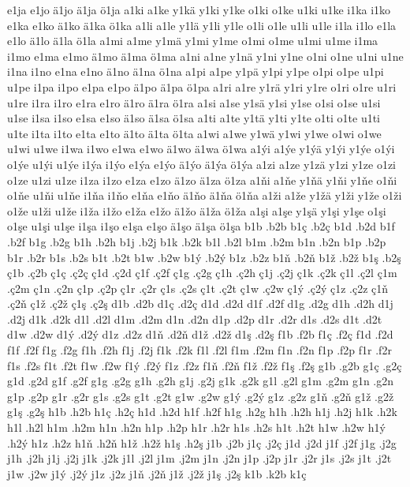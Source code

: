 {e1ja
e1jo
ä1jo
ä1ja
ö1ja
a1ki
a1ke
y1kä
y1ki
y1ke
o1ki
o1ke
u1ki
u1ke
i1ka
i1ko
e1ka
e1ko
ä1ko
ä1ka
ö1ka
a1li
a1le
y1lä
y1li
y1le
o1li
o1le
u1li
u1le
i1la
i1lo
e1la
e1lo
ä1lo
ä1la
ö1la
a1mi
a1me
y1mä
y1mi
y1me
o1mi
o1me
u1mi
u1me
i1ma
i1mo
e1ma
e1mo
ä1mo
ä1ma
ö1ma
a1ni
a1ne
y1nä
y1ni
y1ne
o1ni
o1ne
u1ni
u1ne
i1na
i1no
e1na
e1no
ä1no
ä1na
ö1na
a1pi
a1pe
y1pä
y1pi
y1pe
o1pi
o1pe
u1pi
u1pe
i1pa
i1po
e1pa
e1po
ä1po
ä1pa
ö1pa
a1ri
a1re
y1rä
y1ri
y1re
o1ri
o1re
u1ri
u1re
i1ra
i1ro
e1ra
e1ro
ä1ro
ä1ra
ö1ra
a1si
a1se
y1sä
y1si
y1se
o1si
o1se
u1si
u1se
i1sa
i1so
e1sa
e1so
ä1so
ä1sa
ö1sa
a1ti
a1te
y1tä
y1ti
y1te
o1ti
o1te
u1ti
u1te
i1ta
i1to
e1ta
e1to
ä1to
ä1ta
ö1ta
a1wi
a1we
y1wä
y1wi
y1we
o1wi
o1we
u1wi
u1we
i1wa
i1wo
e1wa
e1wo
ä1wo
ä1wa
ö1wa
a1ýi
a1ýe
y1ýä
y1ýi
y1ýe
o1ýi
o1ýe
u1ýi
u1ýe
i1ýa
i1ýo
e1ýa
e1ýo
ä1ýo
ä1ýa
ö1ýa
a1zi
a1ze
y1zä
y1zi
y1ze
o1zi
o1ze
u1zi
u1ze
i1za
i1zo
e1za
e1zo
ä1zo
ä1za
ö1za
a1ňi
a1ňe
y1ňä
y1ňi
y1ňe
o1ňi
o1ňe
u1ňi
u1ňe
i1ňa
i1ňo
e1ňa
e1ňo
ä1ňo
ä1ňa
ö1ňa
a1ži
a1že
y1žä
y1ži
y1že
o1ži
o1že
u1ži
u1že
i1ža
i1žo
e1ža
e1žo
ä1žo
ä1ža
ö1ža
a1şi
a1şe
y1şä
y1şi
y1şe
o1şi
o1şe
u1şi
u1şe
i1şa
i1şo
e1şa
e1şo
ä1şo
ä1şa
ö1şa
b1b
.b2b
b1ç
.b2ç
b1d
.b2d
b1f
.b2f
b1g
.b2g
b1h
.b2h
b1j
.b2j
b1k
.b2k
b1l
.b2l
b1m
.b2m
b1n
.b2n
b1p
.b2p
b1r
.b2r
b1s
.b2s
b1t
.b2t
b1w
.b2w
b1ý
.b2ý
b1z
.b2z
b1ň
.b2ň
b1ž
.b2ž
b1ş
.b2ş
ç1b
.ç2b
ç1ç
.ç2ç
ç1d
.ç2d
ç1f
.ç2f
ç1g
.ç2g
ç1h
.ç2h
ç1j
.ç2j
ç1k
.ç2k
ç1l
.ç2l
ç1m
.ç2m
ç1n
.ç2n
ç1p
.ç2p
ç1r
.ç2r
ç1s
.ç2s
ç1t
.ç2t
ç1w
.ç2w
ç1ý
.ç2ý
ç1z
.ç2z
ç1ň
.ç2ň
ç1ž
.ç2ž
ç1ş
.ç2ş
d1b
.d2b
d1ç
.d2ç
d1d
.d2d
d1f
.d2f
d1g
.d2g
d1h
.d2h
d1j
.d2j
d1k
.d2k
d1l
.d2l
d1m
.d2m
d1n
.d2n
d1p
.d2p
d1r
.d2r
d1s
.d2s
d1t
.d2t
d1w
.d2w
d1ý
.d2ý
d1z
.d2z
d1ň
.d2ň
d1ž
.d2ž
d1ş
.d2ş
f1b
.f2b
f1ç
.f2ç
f1d
.f2d
f1f
.f2f
f1g
.f2g
f1h
.f2h
f1j
.f2j
f1k
.f2k
f1l
.f2l
f1m
.f2m
f1n
.f2n
f1p
.f2p
f1r
.f2r
f1s
.f2s
f1t
.f2t
f1w
.f2w
f1ý
.f2ý
f1z
.f2z
f1ň
.f2ň
f1ž
.f2ž
f1ş
.f2ş
g1b
.g2b
g1ç
.g2ç
g1d
.g2d
g1f
.g2f
g1g
.g2g
g1h
.g2h
g1j
.g2j
g1k
.g2k
g1l
.g2l
g1m
.g2m
g1n
.g2n
g1p
.g2p
g1r
.g2r
g1s
.g2s
g1t
.g2t
g1w
.g2w
g1ý
.g2ý
g1z
.g2z
g1ň
.g2ň
g1ž
.g2ž
g1ş
.g2ş
h1b
.h2b
h1ç
.h2ç
h1d
.h2d
h1f
.h2f
h1g
.h2g
h1h
.h2h
h1j
.h2j
h1k
.h2k
h1l
.h2l
h1m
.h2m
h1n
.h2n
h1p
.h2p
h1r
.h2r
h1s
.h2s
h1t
.h2t
h1w
.h2w
h1ý
.h2ý
h1z
.h2z
h1ň
.h2ň
h1ž
.h2ž
h1ş
.h2ş
j1b
.j2b
j1ç
.j2ç
j1d
.j2d
j1f
.j2f
j1g
.j2g
j1h
.j2h
j1j
.j2j
j1k
.j2k
j1l
.j2l
j1m
.j2m
j1n
.j2n
j1p
.j2p
j1r
.j2r
j1s
.j2s
j1t
.j2t
j1w
.j2w
j1ý
.j2ý
j1z
.j2z
j1ň
.j2ň
j1ž
.j2ž
j1ş
.j2ş
k1b
.k2b
k1ç
}
